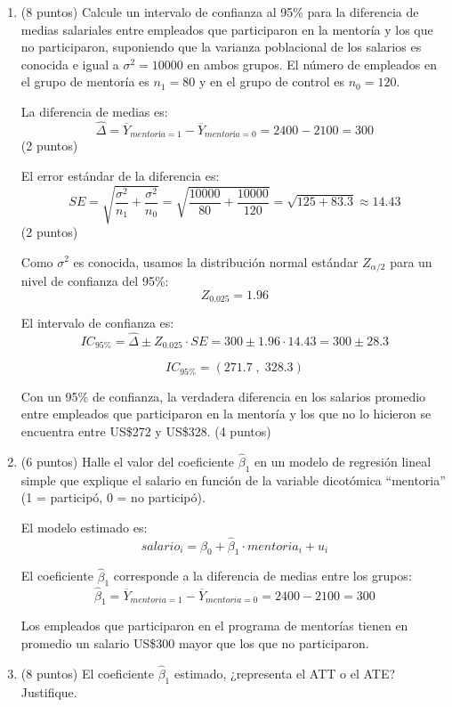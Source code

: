 \documentclass[10pt,a4paper]{article}
\begin{document}
\begin{enumerate}
\begin{enumerate}
    \item (8 puntos) Calcule un intervalo de confianza al 95\% para la diferencia de medias salariales entre empleados que participaron en la mentoría y los que no participaron, 
suponiendo que la varianza poblacional de los salarios es conocida e igual a $\sigma^2 = 10000$ en ambos grupos. 
El número de empleados en el grupo de mentoría es $n_1 = 80$ y en el grupo de control es $n_0 = 120$.

{\color{blue}
La diferencia de medias es:
\[
\hat{\Delta} = \overline{Y}_{mentoría=1} - \overline{Y}_{mentoría=0} = 2400 - 2100 = 300
\] (2 puntos)

El error estándar de la diferencia es:
\[
SE = \sqrt{\frac{\sigma^2}{n_1} + \frac{\sigma^2}{n_0}} 
= \sqrt{\frac{10000}{80} + \frac{10000}{120}} 
= \sqrt{125 + 83.3} \approx 14.43
\]
(2 puntos)

Como $\sigma^2$ es conocida, usamos la distribución normal estándar $Z_{\alpha/2}$ para un nivel de confianza del 95\%:
\[
Z_{0.025} = 1.96
\]

El intervalo de confianza es:
\[
IC_{95\%} = \hat{\Delta} \pm Z_{0.025} \cdot SE 
= 300 \pm 1.96 \cdot 14.43 
= 300 \pm 28.3
\]

\[
IC_{95\%} = (271.7 \;,\; 328.3)
\]

Con un 95\% de confianza, la verdadera diferencia en los salarios promedio entre empleados que participaron en la mentoría y los que no lo hicieron 
se encuentra entre US\$272 y US\$328. (4 puntos)  }
 \item (6 puntos) Halle el valor del coeficiente $\hat{\beta}_1$ en un modelo de regresión lineal simple que explique el salario en función de la variable dicotómica 
    ``mentoria'' (1 = participó, 0 = no participó). 

{\color{blue}  El modelo estimado es:
    \[
    salario_i = \hat{\beta}_0 + \hat{\beta}_1 \cdot mentoria_i + u_i
    \]

    El coeficiente $\hat{\beta}_1$ corresponde a la diferencia de medias entre los grupos:
    \[
    \hat{\beta}_1 = \overline{Y}_{mentoria=1} - \overline{Y}_{mentoria=0} = 2400 - 2100 = 300
    \]

 Los empleados que participaron en el programa de mentorías tienen en promedio un salario 
    US\$300 mayor que los que no participaron.}
\item (8 puntos) El coeficiente $\hat{\beta}_1$ estimado, ¿representa el ATT o el ATE? Justifique.
    

\end{enumerate}
\end{enumerate}
\end{document}
